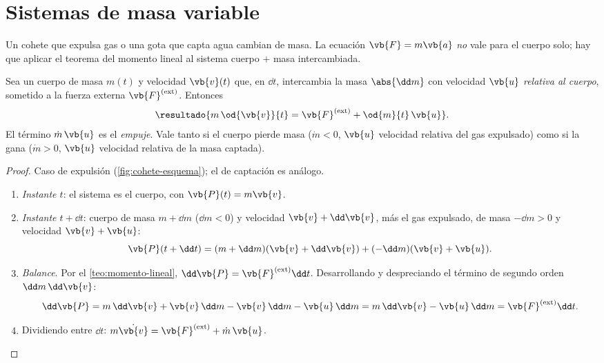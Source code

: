 \section{Sistemas de masa variable}
\label{sec:masa-variable}

Un cohete que expulsa gas o una gota que capta agua cambian de masa. La
ecuación $\vb{F}=m\vb{a}$ \emph{no} vale para el cuerpo solo; hay que aplicar el
teorema del momento lineal al sistema cuerpo $+$ masa intercambiada.

\begin{teorema}
\label{teo:masa-variable}
Sea un cuerpo de masa $m(t)$ y velocidad $\vb{v}(t)$ que, en $\dd t$, intercambia
la masa $\abs{\dd m}$ con velocidad $\vb{u}$ \emph{relativa al cuerpo}, sometido a
la fuerza externa $\vb{F}\ext$. Entonces
\begin{equation}
  \resultado{m\,\od{\vb{v}}{t}=\vb{F}\ext+\od{m}{t}\,\vb{u}} .
  \label{eq:masa-variable}
\end{equation}
El término $\dot m\,\vb{u}$ es el \emph{empuje}. Vale tanto si el cuerpo pierde masa
($\dot m<0$, $\vb{u}$ velocidad relativa del gas expulsado) como si la gana
($\dot m>0$, $\vb{u}$ velocidad relativa de la masa captada).
\end{teorema}

\begin{proof}
Caso de expulsión (\cref{fig:cohete-esquema}); el de captación es análogo.
\begin{enumerate}
  \item \emph{Instante $t$}: el sistema es el cuerpo, con $\vb{P}(t)=m\vb{v}$.
  \item \emph{Instante $t+\dd t$}: cuerpo de masa $m+\dd m$ ($\dd m<0$) y velocidad
  $\vb{v}+\dd\vb{v}$, más el gas expulsado, de masa $-\dd m>0$ y velocidad $\vb{v}+\vb{u}$:
  \[
    \vb{P}(t+\dd t)=(m+\dd m)(\vb{v}+\dd\vb{v})+(-\dd m)(\vb{v}+\vb{u}).
  \]
  \item \emph{Balance}. Por el \cref{teo:momento-lineal}, $\dd\vb{P}=\vb{F}\ext\dd t$.
  Desarrollando y despreciando el término de segundo orden $\dd m\,\dd\vb{v}$:
  \[
    \dd\vb{P}=m\,\dd\vb{v}+\vb{v}\,\dd m-\vb{v}\,\dd m-\vb{u}\,\dd m=m\,\dd\vb{v}-\vb{u}\,\dd m=\vb{F}\ext\dd t .
  \]
  \item Dividiendo entre $\dd t$: $m\dot{\vb{v}}=\vb{F}\ext+\dot m\,\vb{u}$.\qedhere
\end{enumerate}
\end{proof}

